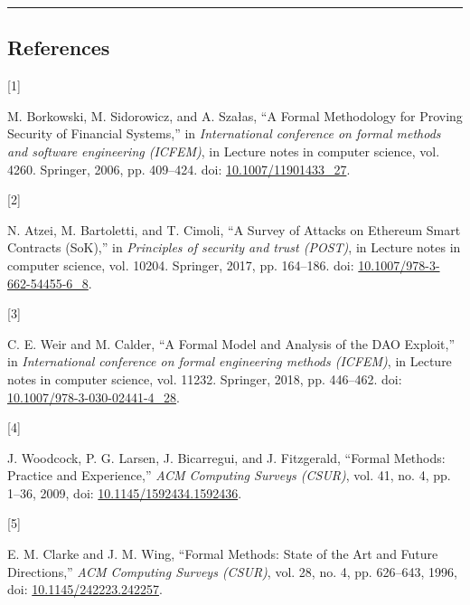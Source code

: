 \documentclass[
  english,
  onecolumn]{article}
\newlength{\cslhangindent}
\newlength{\csllabelwidth}
\newenvironment{CSLReferences}[2] %
 {\begin{list}{}{%
  \setlength{\itemindent}{0pt}
  \setlength{\leftmargin}{0pt}
  \setlength{\parsep}{0pt}
  \ifodd #1
   \setlength{\leftmargin}{\cslhangindent}
   \setlength{\itemindent}{-1\cslhangindent}
  \fi
  \setlength{\itemsep}{#2\baselineskip}}}
 {\end{list}}
\newcommand{\CSLLeftMargin}[1]{\parbox[t]{\csllabelwidth}{\strut#1\strut}}
\newcommand{\CSLRightInline}[1]{\parbox[t]{\linewidth - \csllabelwidth}{\strut#1\strut}}
\begin{document}
\begin{center}\rule{0.5\linewidth}{0.5pt}\end{center}

\subsection*{References}\label{references}

\protect{}\label{refs}
\begin{CSLReferences}{0}{0}
\CSLLeftMargin{{[}1{]} }%
\CSLRightInline{M. Borkowski, M. Sidorowicz, and A. Szałas, {``{A Formal
Methodology for Proving Security of Financial Systems},''} in
\emph{International conference on formal methods and software
engineering (ICFEM)}, in Lecture notes in computer science, vol. 4260.
Springer, 2006, pp. 409--424. doi:
\href{https://doi.org/10.1007/11901433_27}{10.1007/11901433\_27}.}

\CSLLeftMargin{{[}2{]} }%
\CSLRightInline{N. Atzei, M. Bartoletti, and T. Cimoli, {``{A Survey of
Attacks on Ethereum Smart Contracts (SoK)},''} in \emph{Principles of
security and trust (POST)}, in Lecture notes in computer science, vol.
10204. Springer, 2017, pp. 164--186. doi:
\href{https://doi.org/10.1007/978-3-662-54455-6_8}{10.1007/978-3-662-54455-6\_8}.}

\CSLLeftMargin{{[}3{]} }%
\CSLRightInline{C. E. Weir and M. Calder, {``{A Formal Model and
Analysis of the DAO Exploit},''} in \emph{International conference on
formal engineering methods (ICFEM)}, in Lecture notes in computer
science, vol. 11232. Springer, 2018, pp. 446--462. doi:
\href{https://doi.org/10.1007/978-3-030-02441-4_28}{10.1007/978-3-030-02441-4\_28}.}

\CSLLeftMargin{{[}4{]} }%
\CSLRightInline{J. Woodcock, P. G. Larsen, J. Bicarregui, and J.
Fitzgerald, {``{Formal Methods: Practice and Experience},''} \emph{ACM
Computing Surveys (CSUR)}, vol. 41, no. 4, pp. 1--36, 2009, doi:
\href{https://doi.org/10.1145/1592434.1592436}{10.1145/1592434.1592436}.}

\CSLLeftMargin{{[}5{]} }%
\CSLRightInline{E. M. Clarke and J. M. Wing, {``{Formal Methods: State
of the Art and Future Directions},''} \emph{ACM Computing Surveys
(CSUR)}, vol. 28, no. 4, pp. 626--643, 1996, doi:
\href{https://doi.org/10.1145/242223.242257}{10.1145/242223.242257}.}


\end{CSLReferences}
\end{document}

